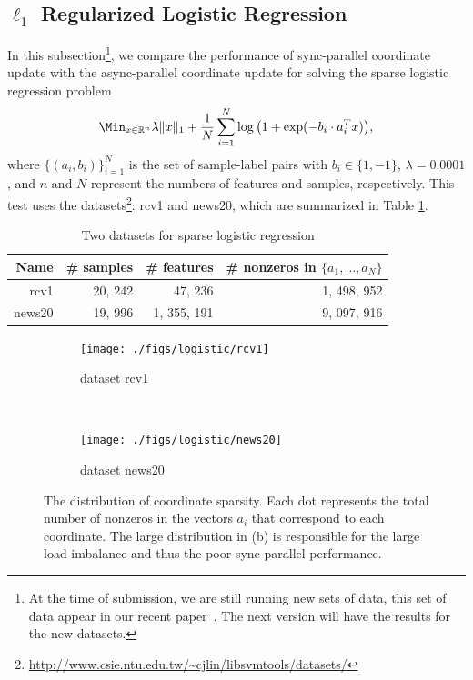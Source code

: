 \subsection{$\ell_1$ Regularized Logistic Regression}
In this subsection\footnote{At the time of submission, we are still running new sets of data, this set of data appear in our recent paper~\cite{Peng_2015_AROCK}. The next version will have the results for the new datasets.}, we compare the performance of sync-parallel coordinate update with the async-parallel coordinate update for solving the sparse logistic regression problem 
\begin{equation}\label{eqn:log}
\Min_{x \in \mathbb{R}^n} \lambda \|x\|_1 + \frac{1}{N} \sum_{i=1}^N \log\big(1 + \exp(-b_i \cdot a_i^T x)\big),
\end{equation}
where $\{(a_i, b_i)\}_{i=1}^N$ is the set of sample-label pairs with $b_i \in \{1, -1\}$, $\lambda=0.0001$, and $n$ and $N$ represent the numbers of features and samples, respectively. This test uses the datasets\footnote{\url{http://www.csie.ntu.edu.tw/~cjlin/libsvmtools/datasets/}}: rcv1 and news20, which are summarized in Table \ref{tab:log_data}.

\begin{table}[htbp]
\centering
 \caption{\label{tab:log_data}Two  datasets for  sparse logistic regression }
 \begin{tabular}{rrrr}
\hline
  Name & \# samples & \# features & \# nonzeros in $\{a_1,\ldots,a_N\}$ \\
  \hline
 rcv1 & 20, 242 & 47, 236 & 1, 498, 952\\
  news20 & 19, 996 & 1, 355, 191 & 9, 097, 916\\
  \hline
 \end{tabular}

\end{table}

\begin{figure}[!h]%
        \centering
       \begin{subfigure}[b]{0.48\textwidth}
                \texttt{[image: ./figs/logistic/rcv1]}
                \caption{ dataset rcv1}
        \end{subfigure}
        ~ %
        \begin{subfigure}[b]{0.48\textwidth}
                \texttt{[image: ./figs/logistic/news20]}
                \caption{  dataset news20}
        \end{subfigure}
        \caption{The distribution of coordinate sparsity. Each dot represents the total number of nonzeros in the vectors $a_i$ that correspond to each coordinate. The large distribution in (b) is responsible  for the large load imbalance and thus the poor sync-parallel performance.}\label{fig:sparsity}
\end{figure}

